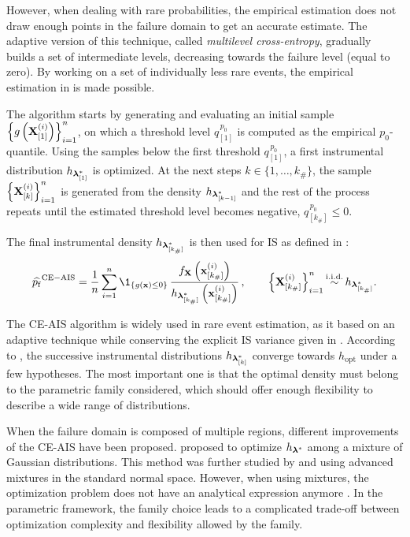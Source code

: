 However, when dealing with rare probabilities, the empirical estimation does not draw enough points in the failure domain to get an accurate estimate. 
The adaptive version of this technique, called \textit{multilevel cross-entropy}, gradually builds a set of intermediate levels, decreasing towards the failure level (equal to zero). 
By working on a set of individually less rare events, the empirical estimation in  is made possible. 

The algorithm starts by generating and evaluating an initial sample $\left\{g\left({\bf X}_{[1]}^{(i)}\right)\right\}_{i=1}^n$, on which a threshold level $q_{[1]}^{\, p_0}$ is computed as the empirical $p_0$-quantile. 
Using the samples below the first threshold $q_{[1]}^{\, p_0}$, a first instrumental distribution $h_{{\boldsymbol{\lambda}}^*_{[1]}}$ is optimized.  
At the next steps $k\in \{1, \dots, k_\# \}$, the sample $\left\{{\bf X}_{[k]}^{(i)}\right\}_{i=1}^n$ is generated from the density $h_{{\boldsymbol{\lambda}}^*_{[k-1]}}$ and the rest of the process repeats until the estimated threshold level becomes negative, $q_{[k_\#]}^{\, p_0} \leq 0$. 

The final instrumental density $h_{{\boldsymbol{\lambda}}^*_{[k_{\#}]}}$ is then used for IS as defined in : 
\begin{equation}
    \what{\pf}^{\mathrm{CE-AIS}} = \frac1n \sum_{i=1}^{n} \1_{\{g(\bx) \leq 0\}} \,
                                                 \frac{f_\bX\left(\bx^{(i)}_{[k_{\#}]}\right)}{ h_{\blambda^*_{[k_{\#}]}}\left(\bx^{(i)}_{[k_{\#}]}\right)}\, , \qquad
                                                 \left\{\bX_{[k_{\#}]}^{(i)}\right\}_{i=1}^n \simiid h_{\blambda^*_{[k_{\#}]}}.
\end{equation}

The CE-AIS algorithm is widely used in rare event estimation, as it based on an adaptive technique while conserving the explicit IS variance given in .  
According to \citet{rubinstein_2004_CE}, the successive instrumental distributions $h_{{\boldsymbol{\lambda}}^*_{[k]}}$ converge towards $h_{\mathrm{opt}}$ under a few hypotheses. 
The most important one is that the optimal density must belong to the parametric family considered, which should offer enough flexibility to describe a wide range of distributions. 

When the failure domain is composed of multiple regions, different improvements of the CE-AIS have been proposed. 
\citet{kurtz_song_2013_aisce} proposed to optimize $h_{{\boldsymbol{\lambda}}^*}$ among a mixture of Gaussian distributions. 
This method was further studied by \citet{wang_2016_aisce} and \citet{papaioannou_2019_aisce} using advanced mixtures in the standard normal space.
However, when using mixtures, the optimization problem does not have an analytical expression anymore \citep{geyer_2019_aisce}.   
In the parametric framework, the family choice leads to a complicated trade-off between optimization complexity and flexibility allowed by the family. 


